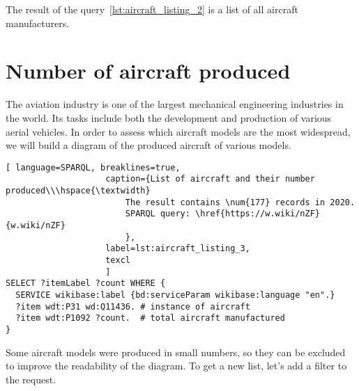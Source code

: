 The result of the query~\ref{lst:aircraft_listing_2} is a list of all aircraft manufacturers.


\label{question:aircraft_manufacturers_en}


\section{Number of aircraft produced}

The aviation industry is one of the largest mechanical engineering industries in the world. Its tasks include both the development 
and production of various aerial vehicles. In order to assess which aircraft models are the most widespread, we will build a diagram 
of the produced aircraft of various models.

\begin{lstlisting}[ language=SPARQL, breaklines=true, 
                    caption={List of aircraft and their number produced\\\hspace{\textwidth}
                        The result contains \num{177} records in 2020. 
                        SPARQL query: \href{https://w.wiki/nZF}{w.wiki/nZF}
                        },
                    label=lst:aircraft_listing_3,
                    texcl 
                    ]
SELECT ?itemLabel ?count WHERE {
  SERVICE wikibase:label {bd:serviceParam wikibase:language "en".}
  ?item wdt:P31 wd:Q11436. # instance of aircraft
  ?item wdt:P1092 ?count.  # total aircraft manufactured
}
\end{lstlisting}

Some aircraft models were produced in small numbers, so they can be excluded to improve the readability of the diagram. 
To get a new list, let's add a filter to the request.

